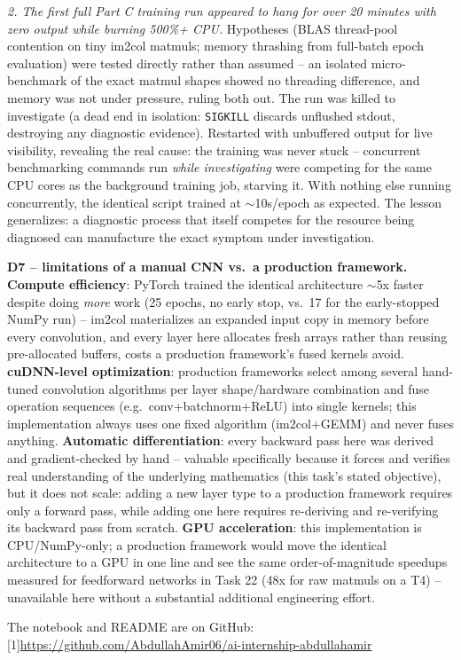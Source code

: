 \documentclass[11pt,a4paper]{article}
\begin{document}
\emph{2. The first full Part C training run appeared to hang for over 20 minutes with zero
output while burning 500\%+ CPU.} Hypotheses (BLAS thread-pool contention on tiny im2col
matmuls; memory thrashing from full-batch epoch evaluation) were tested directly rather than
assumed -- an isolated micro-benchmark of the exact matmul shapes showed no threading
difference, and memory was not under pressure, ruling both out. The run was killed to
investigate (a dead end in isolation: \texttt{SIGKILL} discards unflushed stdout, destroying
any diagnostic evidence). Restarted with unbuffered output for live visibility, revealing the
real cause: the training was never stuck -- concurrent benchmarking commands run \emph{while
investigating} were competing for the same CPU cores as the background training job,
starving it. With nothing else running concurrently, the identical script trained at
$\sim$10s/epoch as expected. The lesson generalizes: a diagnostic process that itself
competes for the resource being diagnosed can manufacture the exact symptom under
investigation.

\textbf{D7 -- limitations of a manual CNN vs.\ a production framework.}
\textbf{Compute efficiency}: PyTorch trained the identical architecture $\sim$5x faster
despite doing \emph{more} work (25 epochs, no early stop, vs.\ 17 for the early-stopped
NumPy run) -- im2col materializes an expanded input copy in memory before every
convolution, and every layer here allocates fresh arrays rather than reusing pre-allocated
buffers, costs a production framework's fused kernels avoid.
\textbf{cuDNN-level optimization}: production frameworks select among several hand-tuned
convolution algorithms per layer shape/hardware combination and fuse operation sequences
(e.g.\ conv+batchnorm+ReLU) into single kernels; this implementation always uses one fixed
algorithm (im2col+GEMM) and never fuses anything.
\textbf{Automatic differentiation}: every backward pass here was derived and
gradient-checked by hand -- valuable specifically because it forces and verifies real
understanding of the underlying mathematics (this task's stated objective), but it does not
scale: adding a new layer type to a production framework requires only a forward pass,
while adding one here requires re-deriving and re-verifying its backward pass from scratch.
\textbf{GPU acceleration}: this implementation is CPU/NumPy-only; a production framework
would move the identical architecture to a GPU in one line and see the same
order-of-magnitude speedups measured for feedforward networks in Task 22 (48x for raw
matmuls on a T4) -- unavailable here without a substantial additional engineering effort.

\vspace{0.4cm}
\noindent The notebook and README are on GitHub: {\small\scalebox{0.72}[1]{\url{https://github.com/AbdullahAmir06/ai-internship-abdullahamir}}}
\end{document}
